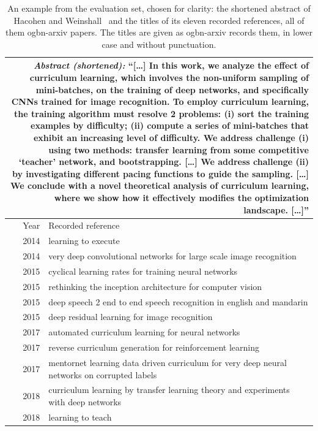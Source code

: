\begin{table}[!ht]
  \centering
  \small
  \begin{tabular}{rp{}}
    \toprule
    \multicolumn{2}{p{0.88\textwidth}}{\textit{Abstract (shortened):} ``[\ldots] In this work, we analyze the effect of curriculum learning, which involves the non-uniform sampling of mini-batches, on the training of deep networks, and specifically CNNs trained for image recognition. To employ curriculum learning, the training algorithm must resolve 2 problems: (i) sort the training examples by difficulty; (ii) compute a series of mini-batches that exhibit an increasing level of difficulty. We address challenge (i) using two methods: transfer learning from some competitive `teacher' network, and bootstrapping. [\ldots] We address challenge (ii) by investigating different pacing functions to guide the sampling. [\ldots] We conclude with a novel theoretical analysis of curriculum learning, where we show how it effectively modifies the optimization landscape. [\ldots]''} \\
    \midrule
    Year & Recorded reference \\
    \midrule
    2014 & learning to execute \\
    2014 & very deep convolutional networks for large scale image recognition \\
    2015 & cyclical learning rates for training neural networks \\
    2015 & rethinking the inception architecture for computer vision \\
    2015 & deep speech 2 end to end speech recognition in english and mandarin \\
    2015 & deep residual learning for image recognition \\
    2017 & automated curriculum learning for neural networks \\
    2017 & reverse curriculum generation for reinforcement learning \\
    2017 & mentornet learning data driven curriculum for very deep neural networks on corrupted labels \\
    2018 & curriculum learning by transfer learning theory and experiments with deep networks \\
    2018 & learning to teach \\
    \bottomrule
  \end{tabular}
  \caption{An example from the evaluation set, chosen for clarity: the shortened abstract of Hacohen and Weinshall~\cite{hacohen2019power} and the titles of its eleven recorded references, all of them ogbn-arxiv papers. The titles are given as ogbn-arxiv records them, in lower case and without punctuation.}
  \label{tab:example}
\end{table}

